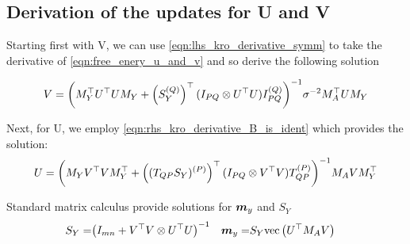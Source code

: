 \subsection*{Derivation of the updates for U and V}

Starting first with V, we can use \eqref{eqn:lhs_kro_derivative_symm} to take the derivative of \eqref{eqn:free_enery_u_and_v} and so derive the following solution

\begin{equation}
V = {\left( M_Y^\top U^\top U M_Y + \left({ S_Y^{(Q)} }\right)^\top (I_{PQ} \otimes U^\top U) { I_{PQ}^{(Q)} }  \right)}^{-1} \sigma^{-2} M_A ^\top U M_Y
\end{equation}

Next, for U, we employ \eqref{eqn:rhs_kro_derivative_B_is_ident} which provides the solution:
\begin{equation}
U = {\left( M_Y V^\top V M_Y^\top + \left( { (T_{QP} S_Y)^{(P)} } \right)^\top (I_{PQ} \otimes V^\top V){ T_{QP}^{(P)} } \right)}^{-1} M_A V M_Y^\top
\end{equation}

Standard matrix calculus provide solutions for $\bm m_y $ and $S_Y$
\begin{align}
S_Y = & {\left( I_{mn} + V^\top V \otimes U^\top U \right)}^{-1}
& \bm m_y = & S_Y \text{vec}\left(U^\top M_A V\right)
\end{align}


